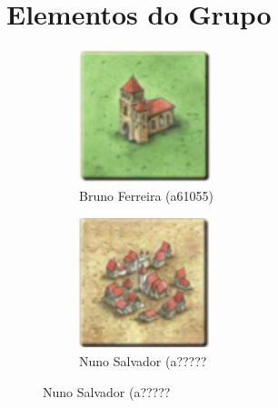 \documentclass[11pt, a4paper, twoside]{article}
\begin{document}
\newpage
\section{Elementos do Grupo}

\begin{figure}[h!]
\centering
\begin{subfigure}{.5\textwidth}
  \centering
  \includegraphics[width=0.8\linewidth]{tileB}
  \caption{Bruno Ferreira (a61055)}
\end{subfigure}%
\begin{subfigure}{.5\textwidth}
  \centering
  \includegraphics[width=0.8\linewidth]{tileC}
  \caption{Nuno Salvador (a?????}
\end{subfigure}%
\end{figure}
\end{document}
